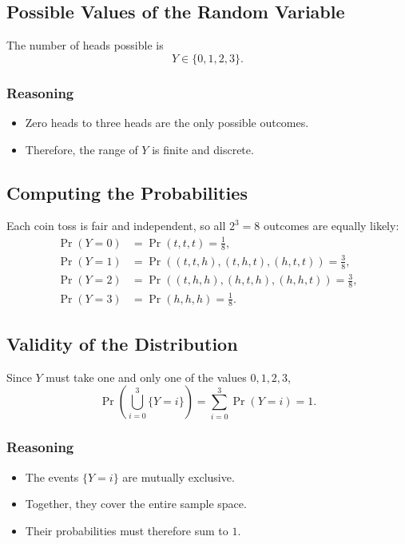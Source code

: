 \documentclass[11pt]{article}
\begin{document}
\subsection{Possible Values of the Random Variable}

The number of heads possible is
\[
Y \in \{0,1,2,3\}.
\]

\subsubsection*{Reasoning}
\begin{itemize}
    \item Zero heads to three heads are the only possible outcomes.
    \item Therefore, the range of $Y$ is finite and discrete.
\end{itemize}

\subsection{Computing the Probabilities}

Each coin toss is fair and independent, so all $2^3=8$ outcomes are equally likely:
\begin{align*}
\Pr(Y=0) &= \Pr(t,t,t) = \frac{1}{8}, \\
\Pr(Y=1) &= \Pr((t,t,h),(t,h,t),(h,t,t)) = \frac{3}{8}, \\
\Pr(Y=2) &= \Pr((t,h,h),(h,t,h),(h,h,t)) = \frac{3}{8}, \\
\Pr(Y=3) &= \Pr(h,h,h) = \frac{1}{8}.
\end{align*}

\subsection{Validity of the Distribution}

Since $Y$ must take one and only one of the values $0,1,2,3$,
\[
\Pr\!\left(\bigcup_{i=0}^{3}\{Y=i\}\right)
= \sum_{i=0}^{3}\Pr(Y=i) = 1.
\]

\subsubsection*{Reasoning}
\begin{itemize}
    \item The events $\{Y=i\}$ are mutually exclusive.
    \item Together, they cover the entire sample space.
    \item Their probabilities must therefore sum to $1$.
\end{itemize}
\end{document}
